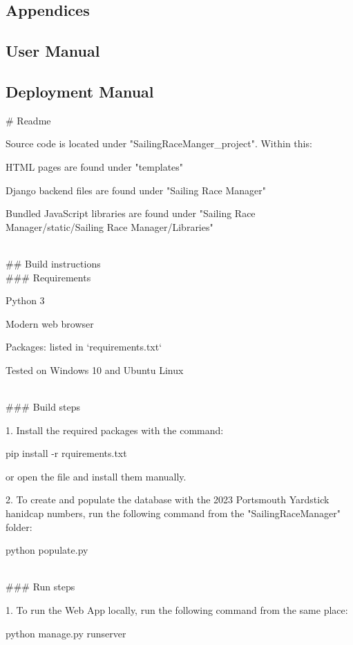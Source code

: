 \documentclass{l4proj}
\begin{document}
\begin{appendices}

\chapter{Appendices}

\section{User Manual}


\section{Deployment Manual}
\# Readme

Source code is located under "SailingRaceManger\_project". Within this:

HTML pages are found under "templates"

Django backend files are found under "Sailing Race Manager"

Bundled JavaScript libraries are found under "Sailing Race Manager/static/Sailing Race Manager/Libraries"

\hfill\\
\#\# Build instructions
\hfill\\
\#\#\# Requirements

Python 3

Modern web browser

Packages: listed in `requirements.txt` 

Tested on Windows 10 and Ubuntu Linux

\hfill\\
\#\#\# Build steps

1. Install the required packages with the command:

	pip install -r rquirements.txt

or open the file and install them manually.

2. To create and populate the database with the 2023 Portsmouth Yardstick hanidcap numbers, run the following command from the "SailingRaceManager" folder:

	python populate.py

\hfill\\
\#\#\# Run steps

1. To run the Web App locally, run the following command from the same place:

	python manage.py runserver


\end{appendices}
\end{document}
